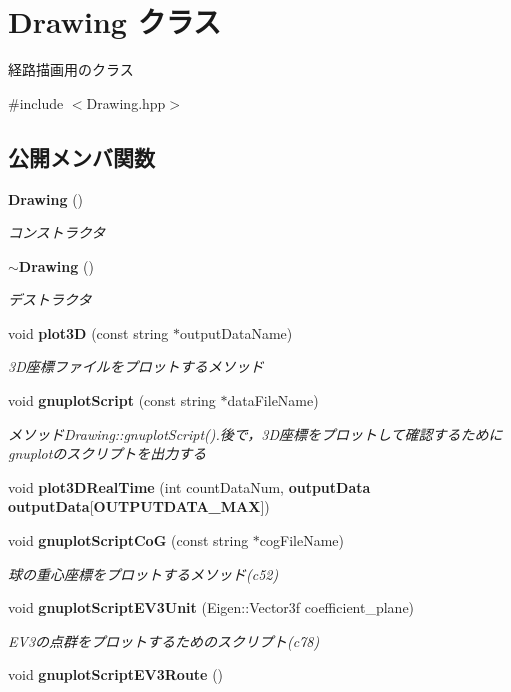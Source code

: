\section{Drawing クラス}
\label{class_drawing}


経路描画用のクラス  




{\ttfamily \#include $<$Drawing.\-hpp$>$}

\subsection*{公開メンバ関数}
\begin{DoxyCompactItemize}
\item 
{\bf Drawing} ()
\begin{DoxyCompactList}\small\item\em コンストラクタ \end{DoxyCompactList}\item 
{\bf $\sim$\-Drawing} ()
\begin{DoxyCompactList}\small\item\em デストラクタ \end{DoxyCompactList}\item 
void {\bf plot3\-D} (const string $\ast$output\-Data\-Name)
\begin{DoxyCompactList}\small\item\em 3\-D座標ファイルをプロットするメソッド \end{DoxyCompactList}\item 
void {\bf gnuplot\-Script} (const string $\ast$data\-File\-Name)
\begin{DoxyCompactList}\small\item\em メソッド\-Drawing\-::gnuplot\-Script().後で，3\-D座標をプロットして確認するためにgnuplotのスクリプトを出力する \end{DoxyCompactList}\item 
void {\bf plot3\-D\-Real\-Time} (int count\-Data\-Num, {\bf output\-Data} {\bf output\-Data}[{\bf O\-U\-T\-P\-U\-T\-D\-A\-T\-A\-\_\-\-M\-A\-X}])
\item 
void {\bf gnuplot\-Script\-Co\-G} (const string $\ast$cog\-File\-Name)
\begin{DoxyCompactList}\small\item\em 球の重心座標をプロットするメソッド(c52) \end{DoxyCompactList}\item 
void {\bf gnuplot\-Script\-E\-V3\-Unit} (Eigen\-::\-Vector3f coefficient\-\_\-plane)
\begin{DoxyCompactList}\small\item\em E\-V3の点群をプロットするためのスクリプト(c78) \end{DoxyCompactList}\item 
void {\bf gnuplot\-Script\-E\-V3\-Route} ()
\end{DoxyCompactItemize}


